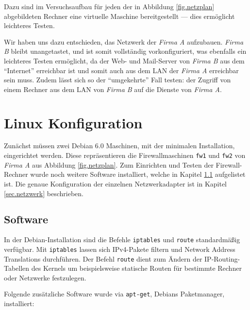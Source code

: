 Dazu sind im Versuchsaufbau für jeden der in Abbildung 
\ref{fig.netzplan} abgebildeten Rechner
eine virtuelle Maschine bereitgestellt --- dies ermöglicht leichteres
Testen.

Wir haben uns dazu entschieden, das Netzwerk der \emph{Firma A} aufzubauen.
\emph{Firma B} bleibt unangetastet, und ist somit vollständig vorkonfiguriert,
was ebenfalls ein leichteres Testen ermöglicht, da der Web- und Mail-Server von
\emph{Firma B} aus dem "`Internet"' erreichbar ist und somit auch aus dem LAN
der \emph{Firma A} erreichbar sein muss.
Zudem lässt sich so der "`umgekehrte"' Fall testen: der Zugriff von einem
Rechner aus dem LAN von \emph{Firma B} auf die Dienste von
\emph{Firma A}.\cite{labor}


\section{Linux Konfiguration}

Zunächst müssen zwei Debian 6.0 Maschinen,
mit der minimalen Installation, eingerichtet werden.
Diese repräsentieren die Firewallmaschinen {\tt fw1} und {\tt fw2} von
\emph{Firma A} aus Abbildung \ref{fig.netzplan}.
Zum Einrichten und Testen der Firewall-Rechner wurde noch weitere Software
installiert, welche in Kapitel \ref{sec.software} aufgelistet ist.
Die genaue Konfiguration der einzelnen Netzwerkadapter ist in Kapitel
\ref{sec.netzwerk} beschrieben.


\subsection{Software}\label{sec.software}

In der Debian-Installation sind die Befehle {\tt iptables} und {\tt route}
standardmäßig verfügbar.
Mit {\tt iptables} lassen sich IPv4-Pakete filtern und Network Address
Translations durchführen.
Der Befehl {\tt route} dient zum Ändern der IP-Routing-Tabellen des Kernels um
beispielsweise statische Routen für bestimmte Rechner oder Netzwerke
festzulegen.

Folgende zusätzliche Software wurde via {\tt apt-get}, Debians Paketmanager,
installiert:

